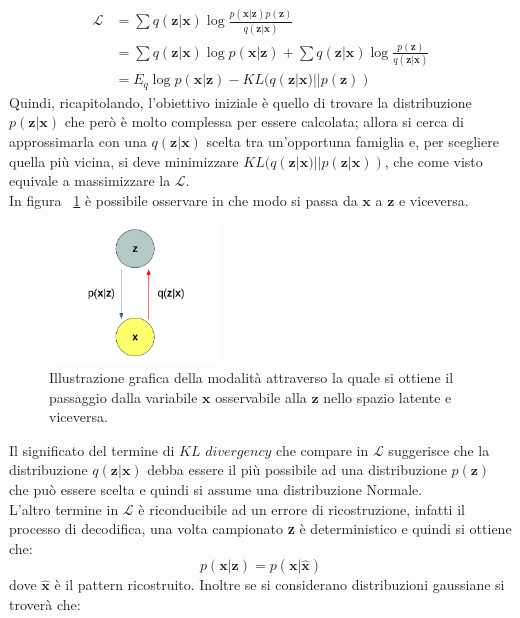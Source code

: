 \begin{align*}
	\mathcal{L} &= \sum q(\textbf{z}|\textbf{x}) \log \frac{p(\textbf{x}|\textbf{z})p(\textbf{z})}{q(\textbf{z}|\textbf{x})} \\ &=
	\sum q(\textbf{z}|\textbf{x}) \log p(\textbf{x}|\textbf{z}) + \sum q(\textbf{z}|\textbf{x}) \log \frac{p(\textbf{z})}{q(\textbf{z}|\textbf{x})} \\ &= E_{q}\log p(\textbf{x}|\textbf{z}) - KL (q(\textbf{z}|\textbf{x}) || p(\textbf{z})) 
\end{align*}
Quindi, ricapitolando, l'obiettivo iniziale è quello di trovare la distribuzione $p(\textbf{z}|\textbf{x})$ che però è molto complessa per essere calcolata; allora si cerca di approssimarla con una $q(\textbf{z}|\textbf{x})$ scelta tra un'opportuna famiglia e, per scegliere quella più vicina, si deve minimizzare $KL (q(\textbf{z}|\textbf{x}) || p(\textbf{z}|\textbf{x}))$, che come visto equivale a massimizzare la $\mathcal{L}$. \\
In figura ~\ref{grafo} è possibile osservare in che modo si passa da $\textbf{x}$ a $\textbf{z}$ e viceversa.

\begin{figure}[h!]
	\centering		\includegraphics[width=0.40\textwidth]{figs/grafoVAE.png}
	\caption{Illustrazione grafica della modalità attraverso la quale si ottiene il passaggio dalla variabile $\textbf{x}$ osservabile alla $\textbf{z}$ nello spazio latente e viceversa.}
	\label{grafo}
\end{figure}
Il significato del termine di $\textit{KL divergency}$ che compare in $\mathcal{L}$ suggerisce che la distribuzione $q(\textbf{z}|\textbf{x})$ debba essere il più possibile ad una distribuzione $p(\textbf{z})$ che può essere scelta e quindi si assume una distribuzione Normale. \\
L'altro termine in $\mathcal{L}$ è riconducibile ad un errore di ricostruzione, infatti il processo di decodifica, una volta campionato \textbf{z} è deterministico e quindi si ottiene che:
\begin{equation}
	p(\textbf{x}|\textbf{z}) = p(\textbf{x}|\hat{\textbf{x}})
\end{equation}
dove $\hat{\textbf{x}}$ è il pattern ricostruito. Inoltre se si considerano distribuzioni gaussiane si troverà che:

